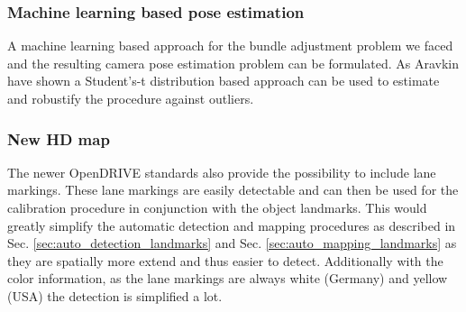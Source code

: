 \subsubsection{Machine learning based pose estimation}
A machine learning based approach for the bundle adjustment problem we faced and the resulting camera pose estimation problem can be formulated.
As Aravkin \etal \cite{students_t_bundle_adjustment} have shown a Student's-t distribution based approach can be used to estimate and robustify the procedure against outliers.
  
\subsubsection{New HD map}
The newer OpenDRIVE standards also provide the possibility to include lane markings.
These lane markings are easily detectable and can then be used for the calibration procedure in conjunction with the object landmarks.
This would greatly simplify the automatic detection and mapping procedures as described in Sec. \ref{sec:auto_detection_landmarks} and Sec. \ref{sec:auto_mapping_landmarks} as they are spatially more extend and thus easier to detect.
Additionally with the color information, as the lane markings are always white (Germany) and yellow (USA) the detection is simplified a lot.